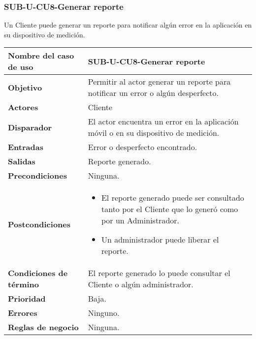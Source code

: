 \subsubsection{SUB-U-CU8-Generar reporte}\label{SUB-U-CU8}
Un Cliente puede generar un reporte para notificar algún error en la aplicación en su dispositivo de medición.
\begin{longtable}{|J{5cm}|J{10.3cm}|}
	\hline
	\textbf{Nombre del caso de uso} &
		SUB-U-CU8-Generar reporte \\ \hline
	\textbf{Objetivo} &
		Permitir al actor generar un reporte para notificar un error o algún desperfecto. \\ \hline
	\textbf{Actores} &
		Cliente \\ \hline 
	\textbf{Disparador} & 
		El actor encuentra un error en la aplicación móvil o en su dispositivo de medición. \\ \hline 
	\textbf{Entradas} & Error o desperfecto encontrado.
		\\ \hline 
	\textbf{Salidas} & Reporte generado.
		\\ \hline
	\textbf{Precondiciones} &
		Ninguna.\\ \hline
	\textbf{Postcondiciones} &
		\begin{itemize}
			\item El reporte generado puede ser consultado tanto por el Cliente que lo generó como por un Administrador.
			\item Un administrador puede liberar el reporte.
		\end{itemize} \\ \hline
	\textbf{Condiciones de término} & El reporte generado lo puede consultar el Cliente o algún administrador.
		\\ \hline 
	\textbf{Prioridad} & 
		Baja. \\ \hline
	\textbf{Errores} & Ninguno.
		\\ \hline
	\textbf{Reglas de negocio} & Ninguna.
		 \\ \hline
\end{longtable}

